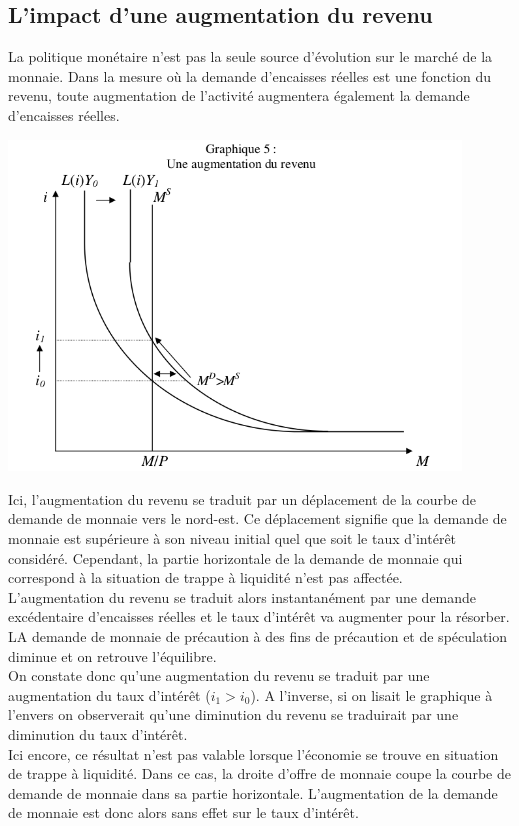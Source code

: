\documentclass[10pt]{book}
\begin{document}
\subsection{L'impact d'une augmentation du revenu}
La politique monétaire n'est pas la seule source d'évolution sur le marché de la monnaie. Dans la mesure où la demande d'encaisses réelles est une fonction du revenu, toute augmentation de l'activité augmentera également la demande d'encaisses réelles.
\begin{center}
  \includegraphics[width=12cm]{graph20.png}
\end{center}
Ici, l'augmentation du revenu se traduit par un déplacement de la courbe de demande de monnaie vers le nord-est. Ce déplacement signifie que la demande de monnaie est supérieure à son niveau initial quel que soit le taux d'intérêt considéré. Cependant, la partie horizontale de la demande de monnaie qui correspond à la situation de trappe à liquidité n'est pas affectée. \\
L'augmentation du revenu se traduit alors instantanément par une demande excédentaire d'encaisses réelles et le taux d'intérêt va augmenter pour la résorber. LA demande de monnaie de précaution à des fins de précaution et de spéculation diminue et on retrouve l'équilibre. \\
On constate donc qu'une augmentation du revenu se traduit par une augmentation du taux d'intérêt ($i_1 > i_0$). A l'inverse, si on lisait le graphique à l'envers on observerait qu'une diminution du revenu se traduirait par une diminution du taux d'intérêt. \\
Ici encore, ce résultat n'est pas valable lorsque l'économie se trouve en situation de trappe à liquidité. Dans ce cas, la droite d'offre de monnaie coupe la courbe de demande de monnaie dans sa partie horizontale. L'augmentation de la demande de monnaie est donc alors sans effet sur le taux d'intérêt.
\end{document}
